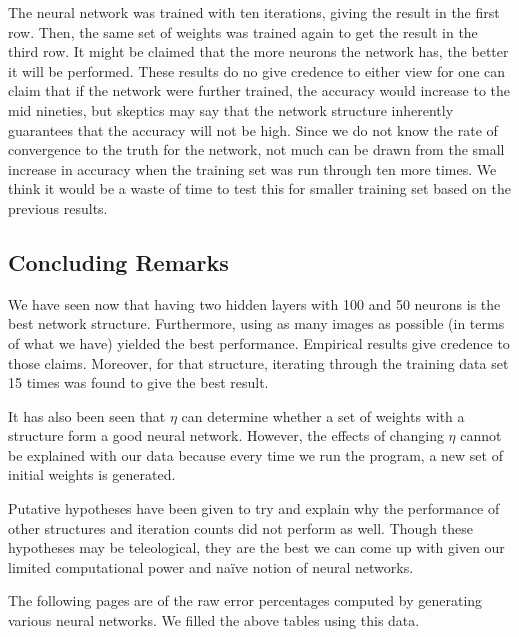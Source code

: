 \documentclass[12pt]{article}
\begin{document}
The neural network was trained with ten iterations, giving the result in the first row.
Then, the same set of weights was trained again to get the result in the third row.
It might be claimed that the more neurons the network has, the better it will be performed.
These results do no give credence to either view for one can claim that if the network were further trained, the accuracy would increase to the mid nineties, but skeptics may say that the network structure inherently guarantees that the accuracy will not be high.
Since we do not know the rate of convergence to the truth for the network, not much can be drawn from the small increase in accuracy when the training set was run through ten more times.  
We think it would be a waste of time to test this for smaller training set based on the previous results.

\subsection*{Concluding Remarks}

We have seen now that having two hidden layers with 100 and 50 neurons is the best network structure.
Furthermore, using as many images as possible (in terms of what we have) yielded the best performance.
Empirical results give credence to those claims.
Moreover, for that structure, iterating through the training data set 15 times was found to give the best result.


It has also been seen that $\eta$ can determine whether a set of weights with a structure form a good neural network.
However, the effects of changing $\eta$ cannot be explained with our data because every time we run the program, a new set of initial weights is generated.


Putative hypotheses have been given to try and explain why the performance of other structures and iteration counts did not perform as well.
Though these hypotheses may be teleological, they are the best we can come up with given our limited computational power and na\"ive notion of neural networks.

The following pages are of the raw error percentages computed by generating various neural networks.
We filled the above tables using this data.
\end{document}
